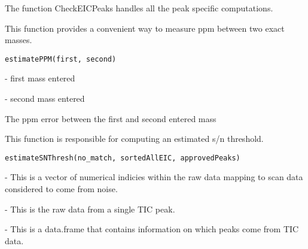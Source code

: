 \documentclass[a4paper]{book}
\begin{document}
%
\begin{Details}\relax
The function CheckEICPeaks handles all the peak specific
computations.
\end{Details}
%
\begin{Description}\relax
This function provides a convenient way to measure ppm between
two exact masses.
\end{Description}
%
\begin{Usage}
\begin{verbatim}
estimatePPM(first, second)
\end{verbatim}
\end{Usage}
%
\begin{Arguments}
\begin{ldescription}
\item[\code{first}] - first mass entered

\item[\code{second}] - second mass entered
\end{ldescription}
\end{Arguments}
%
\begin{Value}
The ppm error between the first and second entered mass
\end{Value}
%
\begin{Description}\relax
This function is responsible for computing an estimated s/n
threshold.
\end{Description}
%
\begin{Usage}
\begin{verbatim}
estimateSNThresh(no_match, sortedAllEIC, approvedPeaks)
\end{verbatim}
\end{Usage}
%
\begin{Arguments}
\begin{ldescription}
\item[\code{no\_match}] - This is a vector of numerical indicies within the raw data
mapping to scan data considered to come from noise.

\item[\code{sortedAllEIC}] - This is the raw data from a single TIC peak.

\item[\code{approvedPeaks}] - This is a data.frame that contains information on
which peaks come from TIC data.
\end{ldescription}
\end{Arguments}
\end{document}
